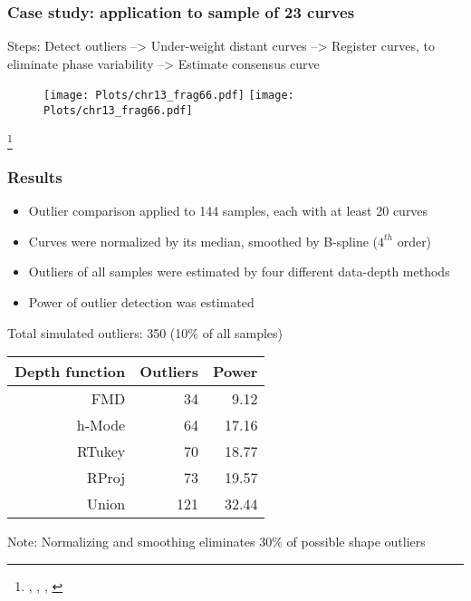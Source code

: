 \documentclass[10pt,dvipsnames,table]{beamer}
\begin{document}
\begin{frame}
\frametitle{Case study: application to sample of 23 curves}
Steps: Detect outliers --> Under-weight distant curves --> Register curves, to eliminate phase variability --> Estimate consensus curve

\begin{figure}[t]
\texttt{[image: Plots/chr13\_frag66.pdf]}
\hspace{0.5cm}
\texttt{[image: Plots/chr13\_frag66.pdf]}
\end{figure}
\footnote{\cite{Febrero-Bande_delaFuente_2012_JSS}, \cite{R-fda}, \cite{Ramsay_Silverman_2002_Applied}, \cite{Ramsay_etal_2009_Functional_R}}
\end{frame}

\begin{frame}
\frametitle{Results}
\begin{itemize}
\item Outlier comparison applied to 144 samples, each with at least 20 curves
\item Curves were normalized by its median, smoothed by B-spline ($4^{th}$ order)
\item Outliers of all samples were estimated by four different data-depth methods
\item Power of outlier detection was estimated
\end{itemize}
\pause
Total simulated outliers: 350 (10\% of all samples) \\
\begin{table}[ht]
\centering
\begin{tabular}{rrr}
  \hline
  \hline
  Depth function & Outliers & Power \\ 
  \hline
  FMD & 34 & 9.12 \\ 
  h-Mode & 64 & 17.16 \\ 
  RTukey & 70 & 18.77 \\ 
  RProj & 73 & 19.57 \\ 
  Union & 121 & 32.44 \\ 
  \hline
  \hline
\end{tabular}
\end{table}
Note: Normalizing and smoothing eliminates 30\% of possible shape outliers
\end{frame}
\end{document}
